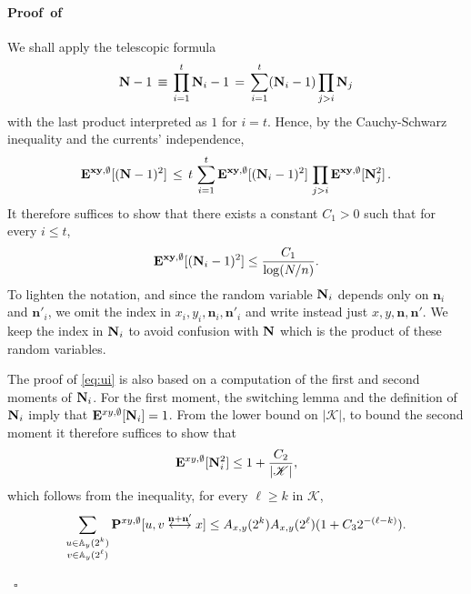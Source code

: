 \documentclass[a4paper,oneside,11pt]{article}
\newcommand{\be}[1]{\begin{equation}\label{#1}}
\newcommand{\ee}{\end{equation}}
\numberwithin{equation}{section}
\numberwithin{equation}{section}
\numberwithin{equation}{section}
\newenvironment{proof}[1][\relax]%
  {\paragraph{Proof\ifx#1\relax\else~of #1\fi}}%
  {~\hfill$\square$\par\bigskip}
\newcommand{\calK}{\mathcal{K}}
\newcommand{\bbA}{\mathbb{A}}
\def\be{\begin{equation}}
\def\ee{\end{equation}}
\newcommand{\n}{\mathbf{n}}
\begin{document}
\begin{proof}
We shall apply the telescopic formula
\[
{\bf N}-1\, \equiv \, \prod_{i=1}^t{\bf N}_i-1 \, =\,  \sum_{i=1}^t({\bf N}_i-1)\prod_{j>i}{\bf N}_j 
\]
with the last product  interpreted as $1$ for $i=t$.
Hence, by the Cauchy-Schwarz inequality and the currents' independence, 
\be{\bf E}^{{\bf xy},\emptyset}[({\bf N}-1)^2]\, \le \, t \, \sum_{i=1}^t{\bf E}^{{\bf xy},\emptyset}[({\bf N}_i-1)^2] 
\,  \prod_{j>i}{\bf E}^{{\bf xy},\emptyset}[{\bf N}_j^2]\,.
\ee
It therefore suffices to show that there exists a constant $C_1>0$ such that for every $i\le t$,
\begin{equation}\label{eq:ui}
{\bf E}^{{\bf xy},\emptyset}[({\bf N}_i-1)^2]\le \frac{C_1}{\log (N/n)}.
\end{equation}
To lighten the notation, and since the random variable ${\bf N}_i$ depends only on $\n_i$ and $\n'_i$, we omit the index in $x_i,y_i,\n_i,\n'_i$ and write instead just $x,y,\n,\n'$.  We keep the index in ${\bf N}_i$ to avoid confusion with ${\bf N}$ which is the product of these random variables. 

The proof of \eqref{eq:ui} is also based on a computation of the first and second moments of ${\bf N}_i$.
For the first moment, the switching lemma and the definition of ${\bf N}_i$ imply that
${\bf E}^{xy,\emptyset}[{\bf N}_i]=1$.
From the lower bound on $|\calK|$, to bound the second moment it therefore suffices to show that 
\begin{align}\label{eq:h1}{\bf E}^{xy,\emptyset}[{\bf N}_i^2]\le 1+\frac{C_2}{|\calK|},\end{align}
which follows from the inequality, for every $\ell\ge k$ in $\calK$, 
\begin{equation}\label{eq:h5}
\sum_{\substack{u\in \bbA_{y}(2^k)\\ v\in\bbA_{y}(2^\ell)}}{\bf P}^{xy,\emptyset}[u,v\stackrel{\n+\n'}\longleftrightarrow x]\le A_{x,y}(2^k)A_{x,y}(2^\ell)(1+C_32^{-(\ell-k)}).
\end{equation}


\end{proof}
\end{document}

